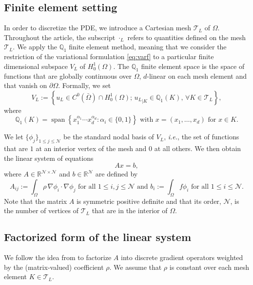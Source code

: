 \documentclass[onefignum,onetabnum]{siamart251216}
\begin{document}
\subsection{Finite element setting}
\label{sub:FEM}
In order to discretize the PDE, we introduce a Cartesian mesh $\mathcal{T}_L$ of $\Omega$. Throughout the article, the subscript $\cdot_L$ refers to quantities defined on the mesh $\mathcal{T}_L$. We apply the $\mathbb Q_1$ finite element method, meaning that we consider the restriction of the variational formulation \eqref{eq:varf} to a particular finite dimensional subspace $V_L$ of $H_0^1(\Omega)$. The $\mathbb Q_1$ finite element space is the space of functions that are globally continuous over $\Omega$, $d$-linear on each mesh element and that vanish on $\partial \Omega$. Formally, we set 
\[
V_L := \left\{u_L \in C^0(\bar{\Omega}) \cap H_0^1(\Omega);\,  {u_L}_{|K} \in \mathbb Q_1(K), \, \forall K \in \mathcal{T}_L \right\},
\] 
where 
\[
\mathbb Q_1(K) = \operatorname{span}\left\{
x_1^{\alpha_1} \cdots x_d^{\alpha_d}
:\alpha_i \in \{0,1\}
\right\} \text{ with } x= (x_1,\dots,x_d) \text{ for } x \in K.
\]


We let $\{ \phi_j \}_{1 \leq j \leq 
\mathcal{N}}$ be the standard nodal basis of  $V_L$, \textit{i.e.}, the set of functions that are $1$ at an interior vertex of the mesh and $0$ at all others. We then obtain the linear system of equations 
\begin{equation}
\label{eq:Axequalb}
     A x = b,
\end{equation}
where $A \in \mathbb R^{\mathcal N \times \mathcal N}$ and $b \in \mathbb R^{\mathcal N}$ are defined by
\begin{equation*}
    A_{ij} := \int_\Omega \rho \, \nabla \phi_i \cdot \nabla \phi_j \text{ for all }1 \leq i,j \leq \mathcal{N} \text{ and } b_i := \int_\Omega  f \phi_i \text{ for all } 1 \leq i \leq \mathcal{N}.
\end{equation*}
Note that the matrix $A$ is symmetric positive definite and that its order, $\mathcal N$, is the number of vertices of $\mathcal{T}_L$ that are in the interior of $\Omega$. 

\subsection{Factorized form of the linear system}

We follow the idea from \cite{Deiml_2025} to factorize $A$ into discrete gradient operators weighted by the (matrix-valued) coefficient $\rho$. We assume that $\rho$ is constant over each mesh element $K \in \mathcal{T}_L$.
\end{document}
